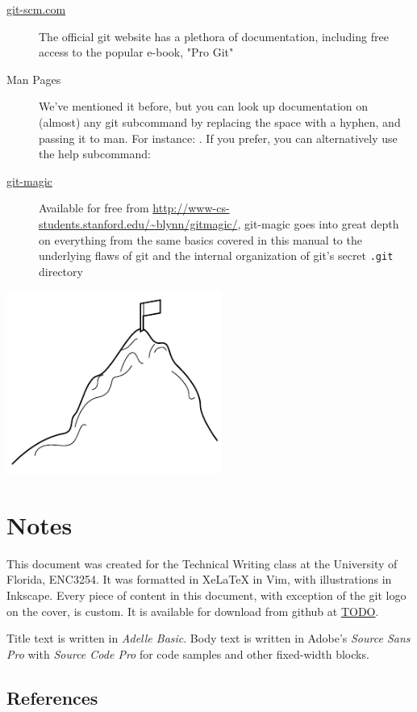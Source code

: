 \documentclass[11pt,letterpaper,twoside]{report}
\begin{document}
\begin{description}
\item[\href{http://git-scm.com/documentation}{git-scm.com}]
    The official git website has a plethora of documentation, including free
    access to the popular e-book, "Pro Git"
\item[Man Pages]
    We've mentioned it before, but you can look up documentation on (almost) any
    git subcommand by replacing the space with a hyphen, and passing it to man.
    For instance: . If you prefer, you can alternatively use
    the help subcommand: 
\item[\href{http://www-cs-students.stanford.edu/~blynn/gitmagic/}{git-magic}]
    Available for free from
    \url{http://www-cs-students.stanford.edu/~blynn/gitmagic/}, git-magic goes
    into great depth on everything from the same basics covered in this manual
    to the underlying flaws of git and the internal organization of git's secret
    \texttt{.git} directory
\end{description}

\vspace{\fill}
\begin{flushright}
\includegraphics[height=6cm]{resources/learning_curve_abstract.pdf}
\end{flushright}
\vspace*{\fill}

\chapter*{Notes}
\pagestyle{empty}
\thispagestyle{empty}

This document was created for the Technical Writing class at the University of
Florida, ENC3254. It was formatted in XeLaTeX in Vim, with illustrations in
Inkscape. Every piece of content in this document, with exception of the git
logo on the cover, is custom. It is available for download from github at
\url{TODO}.

Title text is written in \emph{Adelle Basic}. Body text is written in Adobe's
\emph{Source Sans Pro} with \emph{Source Code Pro} for code samples and other
fixed-width blocks.

\section{References}
\end{document}
